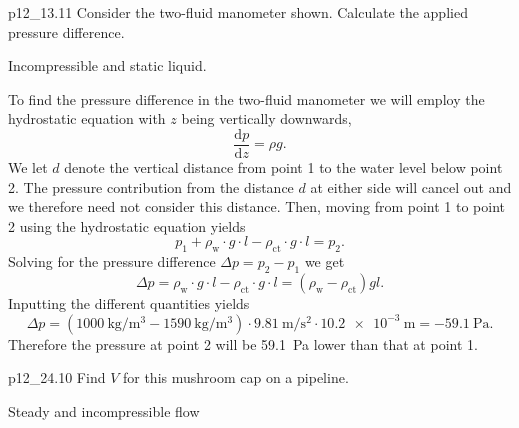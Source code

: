 
\begin{problemwithimage}[0.3\linewidth]{p12_1}{3.11}
  Consider the two-fluid manometer shown.
  Calculate the applied pressure difference.
\end{problemwithimage}

\begin{assumptions}
  \item Incompressible and static liquid.
\end{assumptions}

\begin{derivation}
  To find the pressure difference in the two-fluid manometer we will employ the hydrostatic equation with $z$ being vertically downwards,
  \[ 
  \frac{\mathrm{d}p}{\mathrm{d}z} = \rho g
  .\]
  We let $d$ denote the vertical distance from point 1 to the water level below point 2.
  The pressure contribution from the distance $d$ at either side will cancel out and we therefore need not consider this distance.
  Then, moving from point 1 to point 2 using the hydrostatic equation yields
  \[ 
  p_1 + \rho_{\mathrm{w}} \cdot g \cdot l - \rho_{\mathrm{ct}} \cdot g \cdot l = p_2
.\]
  Solving for the pressure difference $\Delta p = p_2 - p_1$ we get
  \[ 
  \Delta p = \rho_{\mathrm{w}} \cdot g \cdot l - \rho_{\mathrm{ct}} \cdot g \cdot l = \left( \rho_{\mathrm{w}} - \rho_{\mathrm{ct}} \right) gl
  .\]
  Inputting the different quantities yields
  \[ 
  \Delta p = \left( \qty{1000}{\kg\per\cubic\m} - \qty{1590}{\kg\per\cubic\m} \right) \cdot \qty{9,81}{\m\per\s\squared} \cdot \qty{10,2e-3}{\m} = \qty{-59,1}{\Pa} 
  .\]
  Therefore the pressure at point 2 will be \qty{59,1}{\Pa} lower than that at point 1.
\end{derivation}



\begin{problemwithimage}{p12_2}{4.10}
  Find $V$ for this mushroom cap on a pipeline.
\end{problemwithimage}

\begin{assumptions}
  \item Steady and incompressible flow
\end{assumptions}

